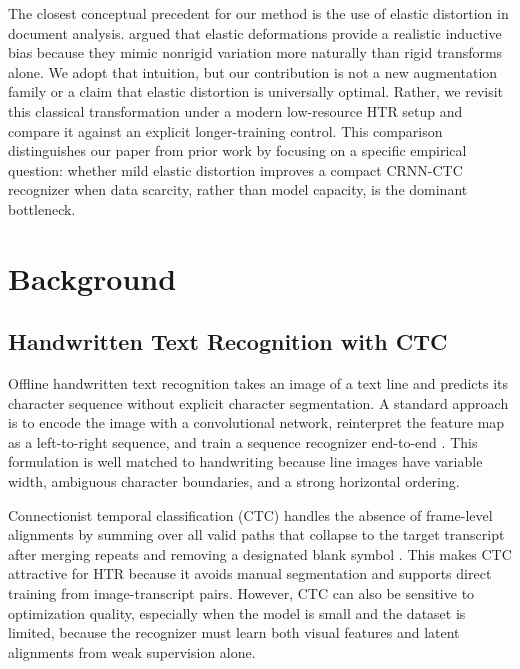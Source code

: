 \documentclass{article} %
\begin{document}
The closest conceptual precedent for our method is the use of elastic distortion in document analysis. \citet{simard2003best} argued that elastic deformations provide a realistic inductive bias because they mimic nonrigid variation more naturally than rigid transforms alone. We adopt that intuition, but our contribution is not a new augmentation family or a claim that elastic distortion is universally optimal. Rather, we revisit this classical transformation under a modern low-resource HTR setup and compare it against an explicit longer-training control. This comparison distinguishes our paper from prior work by focusing on a specific empirical question: whether mild elastic distortion improves a compact CRNN-CTC recognizer when data scarcity, rather than model capacity, is the dominant bottleneck.

\section{Background}
\label{sec:background}

\subsection{Handwritten Text Recognition with CTC}
Offline handwritten text recognition takes an image of a text line and predicts its character sequence without explicit character segmentation. A standard approach is to encode the image with a convolutional network, reinterpret the feature map as a left-to-right sequence, and train a sequence recognizer end-to-end \citep{shi2016crnn}. This formulation is well matched to handwriting because line images have variable width, ambiguous character boundaries, and a strong horizontal ordering.

Connectionist temporal classification (CTC) handles the absence of frame-level alignments by summing over all valid paths that collapse to the target transcript after merging repeats and removing a designated blank symbol \citep{graves2006ctc}. This makes CTC attractive for HTR because it avoids manual segmentation and supports direct training from image-transcript pairs. However, CTC can also be sensitive to optimization quality, especially when the model is small and the dataset is limited, because the recognizer must learn both visual features and latent alignments from weak supervision alone.
\end{document}
